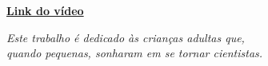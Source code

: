 \documentclass[
12pt,
 a4paper,
    english,
    brazil,
    oneside
    ]{abntex2}
\begin{document}
	
	
	\frenchspacing 
	
	
	\renewcommand{\imprimircapa}{%
		\begin{capa}%
			\center
			{\ABNTEXchapterfont\large\imprimirautor}
			\vspace*{\fill}
			
			{\ABNTEXchapterfont\bfseries\LARGE\imprimirtitulo}
			
			\vspace*{5cm}
			\href{teste.com.br}{\textbf{Link do vídeo}}
			\vspace*{\fill}
			
			{\large\imprimirlocal}
			\par
			{\large\imprimirdata}
			\vspace*{1cm}
		\end{capa}
	}
	\imprimircapa
	
	\imprimirfolhaderosto
	
	\begin{dedicatoria}
		\vspace*{\fill}
		\centering
		\noindent
		\textit{
			Este trabalho é dedicado às crianças adultas que,\\
			quando pequenas, sonharam em se tornar cientistas.\\
			}
	\end{dedicatoria}
	
\end{document}
